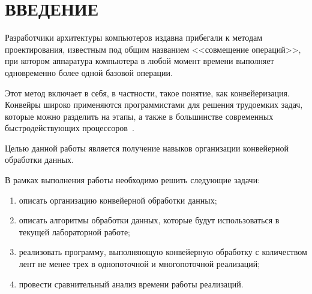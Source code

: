 \chapter*{\hfill{\centering  ВВЕДЕНИЕ}\hfill}


Разработчики архитектуры компьютеров издавна прибегали к методам проектирования, известным под общим названием <<совмещение операций>>, при котором аппаратура компьютера в любой момент времени выполняет одновременно более одной базовой операции.

Этот метод включает в себя, в частности, такое понятие, как
конвейеризация. Конвейры широко применяются программистами для решения трудоемких задач, которые можно разделить на этапы, а также в
большинстве современных быстродействующих процессоров~\cite{conveyor}.


Целью данной работы является получение навыков организации конвейерной обработки данных.

В рамках выполнения работы необходимо решить следующие задачи: 
\begin{enumerate}
	\item описать организацию конвейерной обработки данных;
	\item описать алгоритмы обработки данных, которые будут использоваться в текущей лабораторной работе;
	\item реализовать программу, выполняющую конвейерную обработку с количеством лент не менее трех в однопоточной и многопоточной реализаций;
	\item провести сравнительный анализ времени работы реализаций.
\end{enumerate}



